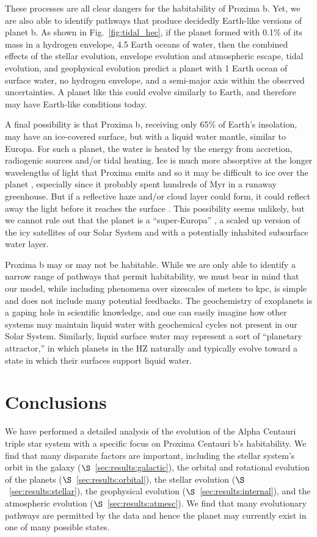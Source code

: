 \documentclass[preprint,12pt]{aastex}
\def\eg{{\it e.g.\ }}
\begin{document}
These processes are all clear dangers for the habitability of Proxima
b. Yet, we are also able to identify pathways that produce decidedly
Earth-like versions of planet b. As shown in Fig.~\ref{fig:tidal_hec},
if the planet formed with 0.1\% of its mass in a hydrogen envelope, 4.5
Earth oceans of water, then the combined effects of the stellar
evolution, envelope evolution and atmospheric escape, tidal evolution,
and geophysical evolution predict a planet with 1 Earth ocean of
surface water, no hydrogen envelope, and a semi-major axis within the
observed uncertainties. A planet like this could evolve similarly to
Earth, and therefore may have Earth-like conditions today.

A final possibility is that Proxima b, receiving only 65\% of Earth's
insolation, may have an ice-covered surface, but with a liquid water
mantle, similar to Europa. For such a planet, the water is heated by
the energy from accretion, radiogenic sources and/or tidal
heating. Ice is much more absorptive at the longer wavelengths of
light that Proxima emits and so it may be difficult to ice over the
planet \citep{JoshiHaberle12,Shields13}, especially since it probably
spent hundreds of Myr in a runaway greenhouse. But if a reflective
haze and/or cloud layer could form, it could reflect away the light
before it reaches the surface \citep[\eg][]{Arney16}. This possibility
seems unlikely, but we cannot rule out that the planet is a
``super-Europa'' \citep{BarnesHeller13}, a scaled up version of the
icy satellites of our Solar System and with a potentially inhabited
subsurface water layer.

Proxima b may or may not be habitable. While we are only able to
identify a narrow range of pathways that permit habitability, we must
bear in mind that our model, while including phenomena over sizescales
of meters to kpc, is simple and does not include many potential
feedbacks. The geochemistry of exoplanets is a gaping hole in
scientific knowledge, and one can easily imagine how other systems may
maintain liquid water with geochemical cycles not present in our Solar
System. Similarly, liquid surface water may represent a sort of
``planetary attractor,'' in which planets in the HZ naturally and
typically evolve toward a state in which their surfaces support liquid
water.

\section{Conclusions\label{sec:concl}}
We have performed a detailed analysis of the evolution of the
Alpha Centauri triple star system with a specific focus on Proxima
Centauri b's habitability. We find that many disparate factors are
important, including the stellar system's orbit in the galaxy
($\S$~\ref{sec:results:galactic}), the orbital and rotational
evolution of the planets ($\S$~\ref{sec:results:orbital}), the stellar
evolution ($\S$~\ref{sec:results:stellar}), the geophysical evolution
($\S$~\ref{sec:results:internal}), and the atmospheric evolution
($\S$~\ref{sec:results:atmesc}). We find that many evolutionary
pathways are permitted by the data and hence the planet may currently
exist in one of many possible states.
\end{document}
